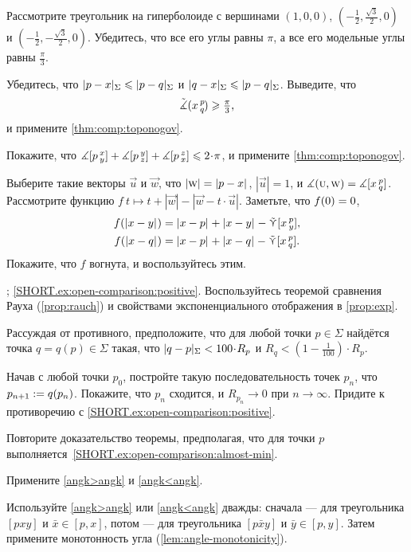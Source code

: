\begin{multicols}{2}
Рассмотрите треугольник на гиперболоиде с вершинами $(1,0,0)$, $(-\tfrac{1}2, \tfrac{\sqrt{3}}2, 0)$ и $(-\tfrac{1}2, -\tfrac{\sqrt{3}}2, 0)$.
Убедитесь, что все его углы равны $\pi$, а все его модельные углы равны $\tfrac{\pi}3$.

Убедитесь, что $\dist{p}{x}\Sigma\le \dist{p}{q}\Sigma$ и $\dist{q}{x}\Sigma\le \dist{p}{q}\Sigma$.
Выведите, что
\[\tilde\measuredangle(x\,{}^{p}_{q}\hspace{-0.2ex})\geqslant \tfrac\pi3,\]
и примените \ref{thm:comp:toponogov}.

Покажите, что 
$\measuredangle\hinge pxy+\measuredangle\hinge pyz+\measuredangle\hinge pzx\z\le2\cdot \pi$,
и примените \ref{thm:comp:toponogov}.

Выберите такие векторы $\vec u$ и $\vec w$, что $|\vec w|\z=\dist{p}{x}{}$, $|\vec u|=1$, и $\measuredangle(\text{\sc{u}},\text{\sc{w}})=\measuredangle[x\,{}^{p}_{q}]$.
Рассмотрите функцию
$f\:t\mapsto t+|\vec w|-|\vec w-t\cdot \vec u|$.
Заметьте, что $f(0)\z=0$,
\begin{align*}
f(\dist{x}{y}{})&=\dist{x}{p}{}+\dist{x}{y}{}-\side\hinge xpy,
\\
f(\dist{x}{q}{})&=\dist{x}{p}{}+\dist{x}{q}{}-\side\hinge xpq.
\end{align*}
Покажите, что $f$ вогнута, и воспользуйтесь этим.

\parbf{\ref{ex:open-comparison}}; \ref{SHORT.ex:open-comparison:positive}.
Воспользуйтесь теоремой сравнения Рауха (\ref{prop:rauch}) и свойствами экспоненциального отображения в \ref{prop:exp}.

Рассуждая от противного,
предположите, что для любой точки $p\in\Sigma$ найдётся точка $q=q(p)\in \Sigma$ такая, что 
$\dist{q}{p}\Sigma< 100\cdot R_p$
и
$R_q<(1-\tfrac1{100})\cdot R_p$.

Начав с любой точки $p_0$, постройте такую последовательность точек $p_n$, что $p_{n+1}\z\df q(p_n)$.
Покажите, что $p_n$ сходится, и $R_{p_n}\to 0$ при $n\to\infty$.
Придите к противоречию с \ref{SHORT.ex:open-comparison:positive}.

Повторите доказательство теоремы, предполагая, что для точки $p$ выполняется~\ref{SHORT.ex:open-comparison:almost-min}.

Примените \ref{angk>angk} и \ref{angk<angk}.

Используйте \ref{angk>angk} или \ref{angk<angk} дважды: 
сначала --- для треугольника $[pxy]$ и $\bar x\in [p,x]$, 
потом --- для треугольника $[p\bar xy]$ и $\bar y\in [p,y]$.
Затем примените монотонность угла (\ref{lem:angle-monotonicity}).


\end{multicols}
